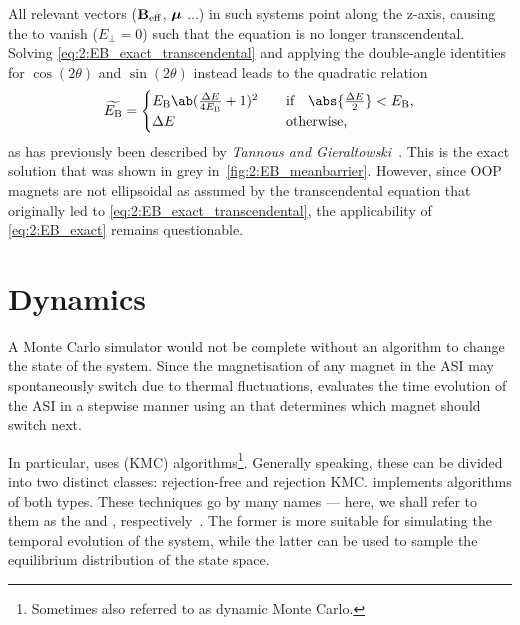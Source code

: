 All relevant vectors ($\boldsymbol{\mathbf{B}}_\mathrm{eff}$, $\boldsymbol{\mathbf{\mu}}$ ...) in such systems point along the z-axis, causing the  to vanish ($E_\perp=0$) such that the equation is no longer transcendental.
Solving \cref{eq:2:EB_exact_transcendental} and applying the double-angle identities for $\cos(2\theta)$ and $\sin(2\theta)$ instead leads to the quadratic relation %
\begin{equation}
	\label{eq:2:EB_exact}
	\widetilde{E_\mathrm{B}} = \begin{cases}
		E_\mathrm{B} \ab(\frac{\Delta E}{4 E_\mathrm{B}} + 1)^2 & \quad \text{if} \quad \abs{\frac{\Delta E}{2}} < E_\mathrm{B}, \\
		\Delta E & \quad \text{otherwise,} \\
	\end{cases}
\end{equation}
as has previously been described by \textit{Tannous and Gieraltowski}~\cite{StonerWohlfarth2008}.
This is the exact solution that was shown in grey in~\cref{fig:2:EB_meanbarrier}.
However, since OOP magnets are not ellipsoidal as assumed by the transcendental equation that originally led to \cref{eq:2:EB_exact_transcendental}, the applicability of \cref{eq:2:EB_exact} remains questionable.

\newpage %
\section{Dynamics}\label{sec:2:Dynamics}
A Monte Carlo simulator would not be complete without an algorithm to change the state of the system.
Since the magnetisation of any magnet in the ASI may spontaneously switch due to thermal fluctuations, \hotspice evaluates the time evolution of the ASI in a stepwise manner using an  that determines which magnet should switch next. \par
In particular, \hotspice uses  (KMC) algorithms\footnote{Sometimes also referred to as dynamic Monte Carlo.}.
Generally speaking, these can be divided into two distinct classes: rejection-free and rejection KMC.
\hotspice implements algorithms of both types.
These techniques go by many names --- here, we shall refer to them as the \emph{} and \emph{}, respectively~\cite{gillespie1976general,PhysicalTimeKMC}.
The former is more suitable for simulating the temporal evolution of the system, while the latter can be used to sample the equilibrium distribution of the state space.

